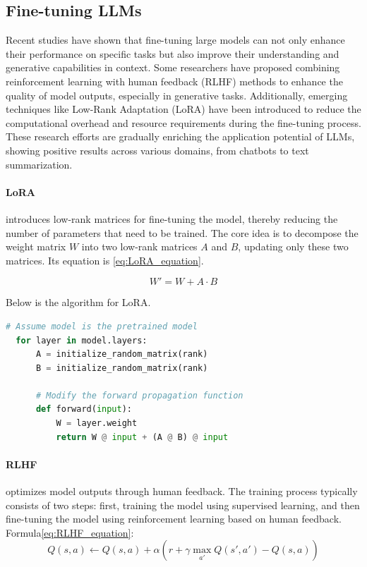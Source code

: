 \documentclass[usenatbib]{tjaa}
\begin{document}
\subsection{Fine-tuning LLMs}
Recent studies have shown that fine-tuning large models
can not only enhance their performance on specific tasks
but also improve their understanding and generative capabilities
in context\citep{hu2021loralowrankadaptationlarge}. Some researchers have proposed combining reinforcement
learning with human feedback (RLHF) methods to enhance
the quality of model outputs, especially in generative
tasks\citep{stiennon2022learningsummarizehumanfeedback}.
Additionally, emerging techniques like Low-Rank Adaptation (LoRA)
have been introduced to reduce the computational overhead
and resource requirements during the fine-tuning process.
These research efforts are gradually enriching the application
potential of LLMs, showing positive results across various domains,
from chatbots to text summarization.

\paragraph{LoRA}
introduces low-rank matrices for fine-tuning the model,
thereby reducing the number of parameters that need to be trained.
The core idea is to decompose the weight matrix $W$ into two low-rank
matrices $A$ and $B$, updating only these two matrices\citep{DBLP:journals/corr/abs-2106-09685}.
Its equation is \ref{eq:LoRA_equation}.

\begin{equation}
  W' = W + A \cdot B
  \label{eq:LoRA_equation} %
\end{equation}

Below is the algorithm for LoRA.

\begin{lstlisting}[language=Python]
  # Assume model is the pretrained model
  for layer in model.layers:
      A = initialize_random_matrix(rank)
      B = initialize_random_matrix(rank)
      
      # Modify the forward propagation function
      def forward(input):
          W = layer.weight
          return W @ input + (A @ B) @ input  
\end{lstlisting}

\paragraph{RLHF}
optimizes model outputs through human feedback.
The training process typically consists of two steps:
first, training the model using supervised learning,
and then fine-tuning the model using reinforcement
learning based on human feedback\citep{DBLP:journals/corr/abs-2009-01325}.
Formula\ref{eq:RLHF_equation}:
\begin{equation}
  Q(s, a) \gets Q(s, a) + \alpha \left( r + \gamma \max_{a'} Q(s', a') - Q(s, a) \right)
  \label{eq:RLHF_equation} %
\end{equation}
\end{document}
